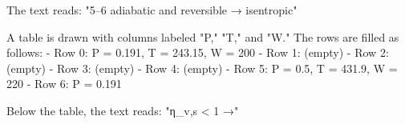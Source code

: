 The text reads:  
"5–6 adiabatic and reversible → isentropic"  

A table is drawn with columns labeled "P," "T," and "W." The rows are filled as follows:  
- Row 0: P = 0.191, T = 243.15, W = 200  
- Row 1: (empty)  
- Row 2: (empty)  
- Row 3: (empty)  
- Row 4: (empty)  
- Row 5: P = 0.5, T = 431.9, W = 220  
- Row 6: P = 0.191  

Below the table, the text reads:  
"η_v,s < 1 →"